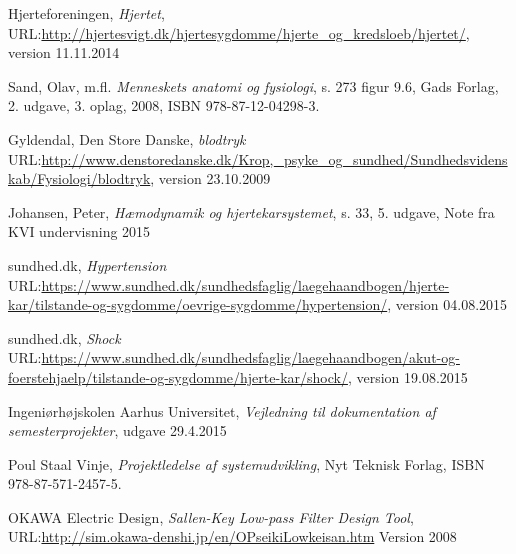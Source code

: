 \begin{thebibliography}{9}
	
	Hjerteforeningen,
	\emph{Hjertet},
	URL:\url{http://hjertesvigt.dk/hjertesygdomme/hjerte_og_kredsloeb/hjertet/},
	version 11.11.2014
	
	Sand, Olav, m.fl.
	\emph{Menneskets anatomi og fysiologi},
	s. 273 figur 9.6,
	Gads Forlag,
	2. udgave, 3. oplag,
	2008, ISBN 978-87-12-04298-3. 
	
	Gyldendal, Den Store Danske,
	\emph{blodtryk}
	URL:\url{http://www.denstoredanske.dk/Krop,_psyke_og_sundhed/Sundhedsvidenskab/Fysiologi/blodtryk},
	version 23.10.2009
	
	Johansen, Peter,
	\emph{Hæmodynamik og hjertekarsystemet},
	s. 33,
	5. udgave,
	Note fra KVI undervisning 2015
	
	sundhed.dk,
	\emph{Hypertension}
	URL:\url{https://www.sundhed.dk/sundhedsfaglig/laegehaandbogen/hjerte-kar/tilstande-og-sygdomme/oevrige-sygdomme/hypertension/},
	version 04.08.2015
	
	sundhed.dk,
	\emph{Shock}
	URL:\url{https://www.sundhed.dk/sundhedsfaglig/laegehaandbogen/akut-og-foerstehjaelp/tilstande-og-sygdomme/hjerte-kar/shock/},
	version 19.08.2015
	
	Ingeniørhøjskolen Aarhus Universitet,
	\emph{Vejledning til dokumentation af semesterprojekter},
	udgave 29.4.2015
	
	
	Poul Staal Vinje,
	\emph{Projektledelse af systemudvikling},
	Nyt Teknisk Forlag,
	ISBN 978-87-571-2457-5.
	
	OKAWA Electric Design,
	\emph{Sallen-Key Low-pass Filter Design Tool},
	URL:\url{http://sim.okawa-denshi.jp/en/OPseikiLowkeisan.htm}
	Version 2008
	
\end{thebibliography}


